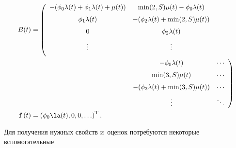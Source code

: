 \begin{align*}

    B(t)&=       \left(

    \begin{array}{cc}

        -(\phi_0\lambda(t)+\phi_1\lambda(t) + \mu(t)) & \min(2, S)\mu(t)-\phi_0\lambda(t)\\[6pt]

           \phi_1\lambda(t) & -(\phi_2\lambda(t) + \min(2, S)\mu(t))\\[6pt]

        0 & \phi_2\lambda(t)\\[6pt]

        \vdots   & \vdots\\[6pt]   

    \end{array}\right.\\

   & \left.

    \begin{array}{cc}

        \hspace*{50mm}  -\phi_0\lambda(t)  & \cdots \\[6pt]                       

                \hspace*{50mm}  \min(3, S)\mu(t)    & \cdots \\[6pt]                      

                \hspace*{50mm}  -(\phi_3\lambda(t) + \min(3, S)\mu(t)) &  \cdots \\[6pt]  

               \hspace*{50mm}   \vdots  & \ddots    %

              \end{array}                         

                \right)


\\

\mathbf{f}\left(t\right)&=\left(\phi_0\la(t),0,0, \ldots\right)^{\mathrm{T}}.

\end{align*}



Для получения нужных свойств и~оценок потребуются некоторые вспомогательные 

